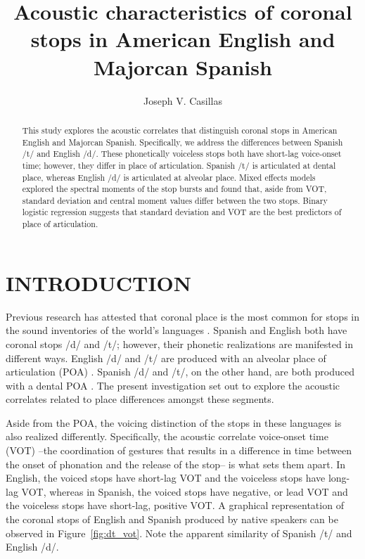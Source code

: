 \documentclass[a4paper,10pt,twocolumn]{article}\usepackage[]{graphicx}\usepackage[]{color}
\title{Acoustic characteristics of coronal stops in American English and Majorcan Spanish}
\author{Joseph V. Casillas}
\begin{document}
\twocolumn[
	\begin{@twocolumnfalse}
	\maketitle
	\end{@twocolumnfalse}
	]

\begin{abstract}
    This study explores the acoustic correlates that distinguish coronal stops in American English and Majorcan Spanish. Specifically, we address the differences between Spanish /t/ and English /d/. These phonetically voiceless stops both have short-lag voice-onset time; however, they differ in place of articulation. Spanish /t/ is articulated at dental place, whereas English /d/ is articulated at alveolar place. Mixed effects models explored the spectral moments of the stop bursts and found that, aside from VOT, standard deviation and central moment values differ between the two stops. Binary logistic regression suggests that standard deviation and VOT are the best predictors of place of articulation. 
\end{abstract}



\section{INTRODUCTION} %
\label{sec:introduction}

	Previous research has attested that coronal place is the most common for stops in the sound inventories of the world's languages \cite{henton_1992fk}. Spanish and English both have coronal stops /d/ and /t/; however, their phonetic realizations are manifested in different ways. English /d/ and /t/ are produced with an alveolar place of articulation (POA) \cite{picard1987introduction}. Spanish /d/ and /t/, on the other hand, are both produced with a dental POA \cite{hualde2005sounds}. The present investigation set out to explore the acoustic correlates related to place differences amongst these segments.
	
	Aside from the POA, the voicing distinction of the stops in these languages is also realized differently. Specifically, the acoustic correlate voice-onset time (VOT) --the coordination of gestures that results in a difference in time between the onset of phonation and the release of the stop-- is what sets them apart. In English, the voiced stops have short-lag VOT and the voiceless stops have long-lag VOT, whereas in Spanish, the voiced stops have negative, or lead VOT and the voiceless stops have short-lag, positive VOT. A graphical representation of the coronal stops of English and Spanish produced by native speakers can be observed in Figure~\ref{fig:dt_vot}. Note the apparent similarity of Spanish /t/ and English /d/. 
\end{document}
